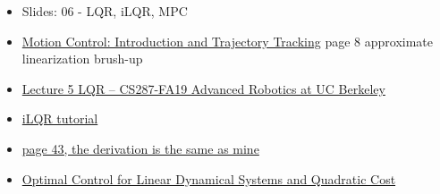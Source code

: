 \begin{itemize}
    \item Slides: 06 - LQR, iLQR, MPC
    \item \href{http://www.diag.uniroma1.it/~oriolo/amr/slides/WheeledMobileRobots4_Slides.pdf}{Motion Control: Introduction
              and Trajectory Tracking} page 8 approximate linearization brush-up
    \item \href{https://www.youtube.com/watch?v=S5LavPCJ5vw}{Lecture 5 LQR -- CS287-FA19 Advanced Robotics at UC Berkeley}
    \item \href{https://rexlab.ri.cmu.edu/papers/iLQR_Tutorial.pdf}{iLQR tutorial}
    \item \href{https://lucasjanson.fas.harvard.edu/courses/6a.pdf}{page 43, the derivation is the same as mine}
    \item \href{https://people.eecs.berkeley.edu/~pabbeel/cs287-fa12/slides/LQR.pdf}{Optimal Control for Linear Dynamical Systems and Quadratic Cost}
\end{itemize}
